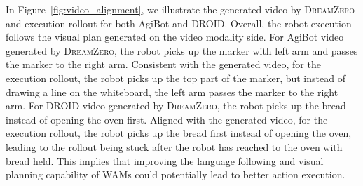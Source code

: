 \documentclass[10pt,logo,copyright]{nvidiatechreport}
\newcommand{\ourmethod}{\mbox{\textsc{DreamZero}}\xspace}
\begin{document}
In Figure~\ref{fig:video_alignment}, we illustrate the generated video by \ourmethod and execution rollout for both AgiBot and DROID. Overall, the robot execution follows the visual plan generated on the video modality side. For AgiBot video generated by \ourmethod, the robot picks up the marker with left arm and passes the marker to the right arm. Consistent with the generated video, for the execution rollout, the robot picks up the top part of the marker, but instead of drawing a line on the whiteboard, the left arm passes the marker to the right arm. For DROID video generated by \ourmethod, the robot picks up the bread instead of opening the oven first. Aligned with the generated video, for the execution rollout, the robot picks up the bread first instead of opening the oven, leading to the rollout being stuck after the robot has reached to the oven with bread held. This implies that improving the language following and visual planning capability of WAMs could potentially lead to better action execution. 

\clearpage
{}


\end{document}
